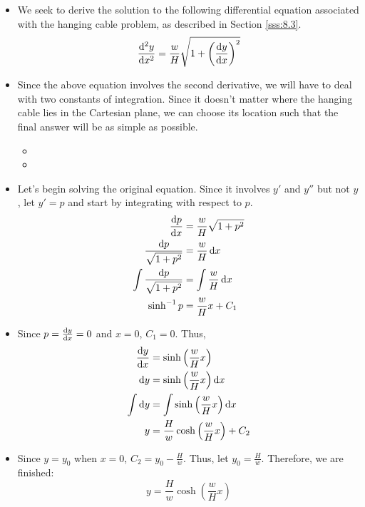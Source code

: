 \documentclass[../main.tex]{subfiles}
\begin{document}
\begin{itemize}
    \item We seek to derive the solution to the following differential equation associated with the hanging cable problem, as described in Section \ref{sss:8.3}.
    \begin{equation*}
        \dv[2]{y}{x} = \frac{w}{H}\sqrt{1+\left( \dv{y}{x} \right)^2}
    \end{equation*}
    \item Since the above equation involves the second derivative, we will have to deal with two constants of integration. Since it doesn't matter where the hanging cable lies in the Cartesian plane, we can choose its location such that the final answer will be as simple as possible.
    \begin{itemize}
        \item {}
        \item {}
    \end{itemize}
    \item Let's begin solving the original equation. Since it involves $y'$ and $y''$ but not $y$, let $y'=p$ and start by integrating with respect to $p$.
    \begin{align*}
        \dv{p}{x} &= \frac{w}{H}\sqrt{1+p^2}\\
        \frac{\dd p}{\sqrt{1+p^2}} &= \frac{w}{H}\dd{x}\\
        \int\frac{\dd p}{\sqrt{1+p^2}} &= \int\frac{w}{H}\dd{x}\\
        \sinh^{-1}p &= \frac{w}{H}x+C_1
    \end{align*}
    \item Since $p=\dv{y}{x}=0$ and $x=0$, $C_1=0$. Thus,
    \begin{align*}
        \dv{y}{x} &= \sinh\left( \frac{w}{H}x \right)\\
        \dd y &= \sinh\left( \frac{w}{H}x \right)\dd{x}\\
        \int\dd y &= \int\sinh\left( \frac{w}{H}x \right)\dd{x}\\
        y &= \frac{H}{w}\cosh\left( \frac{w}{H}x \right)+C_2
    \end{align*}
    \item Since $y=y_0$ when $x=0$, $C_2=y_0-\frac{H}{w}$. Thus, let $y_0=\frac{H}{w}$. Therefore, we are finished:
    \begin{equation*}
        y = \frac{H}{w}\cosh\left( \frac{w}{H}x \right)
    \end{equation*}
\end{itemize}
\end{document}
